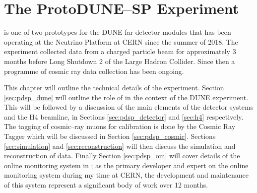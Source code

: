 \chapter{\label{ch:protodune}The ProtoDUNE--SP Experiment} 

%
% 

\minitoc

\protodune{} is one of two prototypes for the DUNE far detector modules that has
been operating at the Neutrino Platform at CERN since the summer of 2018. The
experiment collected data from a charged particle beam for approximately 3 
months before Long Shutdown 2 of the Large Hadron Collider. Since then a 
programme of cosmic ray data collection has been ongoing.

This chapter will outline the technical details of the \protodune{} experiment.
Section \ref{sec:pdsp_dune} will outline the role of \protodune{} in the context
of the DUNE experiment. This will be followed by a discussion of the main
elements of the \protodune{} detector systems and the H4 beamline, in Sections 
\ref{sec:pdsp_detector} and \ref{sec:h4} respectively. The tagging of 
cosmic--ray muons for calibration is done by the Cosmic Ray Tagger which will 
be discussed in Section \ref{sec:pdsp_cosmic}. Sections \ref{sec:simulation} 
and \ref{sec:reconstruction} will then discuss the simulation and 
reconstruction of \protodune{} data. Finally Section \ref{sec:pdsp_om} will 
cover details of the online monitoring system in \protodune{}; as the primary 
developer and expert on the \protodune{} online monitoring system during my 
time at CERN, the development and maintenance of this system represent a 
significant body of work over 12 months.  

